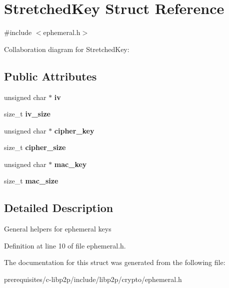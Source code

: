 \hypertarget{struct_stretched_key}{}\section{Stretched\+Key Struct Reference}
\label{struct_stretched_key}


{\ttfamily \#include $<$ephemeral.\+h$>$}



Collaboration diagram for Stretched\+Key\+:
\subsection*{Public Attributes}
\begin{DoxyCompactItemize}
\item 
\mbox{\label{struct_stretched_key_a1dd3472d8977bfaf3285a87f2df3282e}} 
unsigned char $\ast$ {\bfseries iv}
\item 
\mbox{\label{struct_stretched_key_abce6c9021328b6d5e1ae80b7c49a3795}} 
size\+\_\+t {\bfseries iv\+\_\+size}
\item 
\mbox{\label{struct_stretched_key_aa6d51bfe96b73dc5ca112fa94d29ac6f}} 
unsigned char $\ast$ {\bfseries cipher\+\_\+key}
\item 
\mbox{\label{struct_stretched_key_a15dc999b7f90a252f44bb65534d6b25e}} 
size\+\_\+t {\bfseries cipher\+\_\+size}
\item 
\mbox{\label{struct_stretched_key_af5666aa6b237cd36bda4cafa917455c1}} 
unsigned char $\ast$ {\bfseries mac\+\_\+key}
\item 
\mbox{\label{struct_stretched_key_a426eee4e341eecec34f93de76aa8bc5e}} 
size\+\_\+t {\bfseries mac\+\_\+size}
\end{DoxyCompactItemize}


\subsection{Detailed Description}
General helpers for ephemeral keys 

Definition at line 10 of file ephemeral.\+h.



The documentation for this struct was generated from the following file\+:\begin{DoxyCompactItemize}
\item 
prerequisites/c-\/libp2p/include/libp2p/crypto/ephemeral.\+h\end{DoxyCompactItemize}
